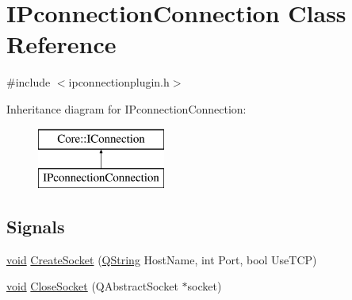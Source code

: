 \hypertarget{class_i_pconnection_connection}{\section{\-I\-Pconnection\-Connection \-Class \-Reference}
\label{class_i_pconnection_connection}
}


{\ttfamily \#include $<$ipconnectionplugin.\-h$>$}

\-Inheritance diagram for \-I\-Pconnection\-Connection\-:\begin{figure}[H]
\begin{center}
\leavevmode
\includegraphics[height=2.000000cm]{class_i_pconnection_connection}
\end{center}
\end{figure}
\subsection*{\-Signals}
\begin{DoxyCompactItemize}
\item 
\hyperlink{group___u_a_v_objects_plugin_ga444cf2ff3f0ecbe028adce838d373f5c}{void} \hyperlink{group___i_p_conn_plugin_gae512a545bf7714b3a085d0a9ffec49e5}{\-Create\-Socket} (\hyperlink{group___u_a_v_objects_plugin_gab9d252f49c333c94a72f97ce3105a32d}{\-Q\-String} \-Host\-Name, int \-Port, bool \-Use\-T\-C\-P)
\item 
\hyperlink{group___u_a_v_objects_plugin_ga444cf2ff3f0ecbe028adce838d373f5c}{void} \hyperlink{group___i_p_conn_plugin_ga382e928a679913b5d226abbd10a08167}{\-Close\-Socket} (\-Q\-Abstract\-Socket $\ast$socket)
\end{DoxyCompactItemize}
